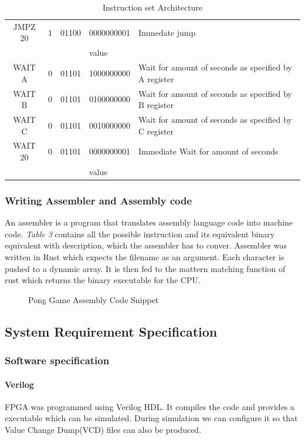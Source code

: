 \documentclass[a4paper,12pt]{article}
\begin{document}
\begin{table}[h]
{\begin{tabular}{|c|l|l|l|p{6cm}|}
    JMPZ 20 & 1 & 01100 & 0000000001 & Immedate jump \\ 
    &  &  & value  & \\ \hline
    WAIT A & 0 & 01101 & 1000000000 & Wait for amount of seconds as specified by A register\\ \hline
    WAIT B & 0 & 01101 & 0100000000 &  Wait for amount of seconds as specified by B register\\ \hline
    WAIT C & 0 & 01101 & 0010000000 &  Wait for amount of seconds as specified by C register\\ \hline
    WAIT 20 & 0 & 01101 & 0000000001 &  Immediate Wait for amount of seconds \\ 
    &  &  & value  & \\ \hline
    \end{tabular}
    }
    \caption{Instruction set Architecture}
    \end{table}



    \subsubsection{Writing Assembler and Assembly code}

    An assembler is a program that translates assembly language code into machine code. \textit{Table 3} contains all the possible instruction and its equivalent binary equivalent with description, which the assembler has to conver. Assembler was written in Rust which expects the filename as an argument. Each character is pushed to a dynamic array. It is then fed to the mattern matching function of rust which returns the binary executable for the CPU.

    \begin{figure}[H]
    \centering
    
    \caption{Pong Game Assembly Code Snippet}
    \end{figure}

    \newpage
    \subsection{System Requirement Specification}
    \subsubsection{Software specification}
    \paragraph{Verilog} 
    FPGA was programmed using Verilog HDL. It compiles the code and provides a executable which can be simulated. During simulation we can configure it so that Value Change Dump(VCD) files can also be produced.
\end{document}

